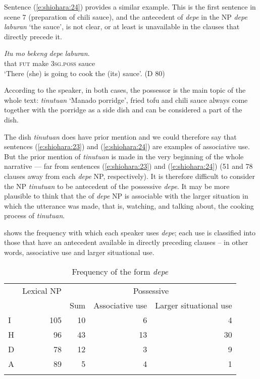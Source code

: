 \documentclass[output=paper
,modfonts
,nonflat]{langsci/langscibook}
\begin{document}
\noindent
Sentence (\ref{e:shiohara:24}) provides a similar example. This is the first sentence in scene 7 (preparation of chili sauce), and the antecedent of \textit{depe} in the NP \textit{depe laburan} ‘the sauce’, is not clear, or at least is unavailable in the clauses that directly precede it.

\begin{exe}
	\ex\label{e:shiohara:24}
	\gll \textit{Itu}   \textit{mo}   \textit{bekeng}   \textit{depe}  \textit{laburan}.\\
	that  \textsc{fut}  make    \textsc{3sg.poss}  sauce\\
	\glt ‘There (she) is going to cook the (its) sauce’. \hfill{(D 80)}
\end{exe}

\noindent
According to the speaker, in both cases, the possessor is the main topic of the whole text: \textit{tinutuan} ‘Manado porridge’, fried tofu and chili sauce always come together with the porridge as a side dish and can be considered a part of the dish.

The dish \textit{tinutuan} does have prior mention and we could therefore say that sentences (\ref{e:shiohara:23}) and (\ref{e:shiohara:24}) are examples of  associative use. But the prior mention of \textit{tinutuan} is made in the very beginning of the whole narrative — far from sentences (\ref{e:shiohara:23}) and (\ref{e:shiohara:24}) (51 and 78 clauses away from each \textit{depe} NP, respectively). It is therefore difficult to consider the NP \textit{tinutuan} to be antecedent of the possessive \textit{depe}. It may be more plausible to think that the  of \textit{depe} NP is associable with the larger situation in which the utterance was made, that is, watching, and talking about, the cooking process of \textit{tinutuan}.

 shows the frequency with which each speaker uses \textit{depe}; each use is classified into those that have an antecedent available in directly preceding clauses – in other words, associative  use and larger situational use.

\begin{table}
	\begin{tabularx}{\textwidth}{Xrrrr} 
		\lsptoprule
		& Lexical NP & \multicolumn{3}{c}{Possessive}\\\cmidrule{3-5}
		&  & Sum & Associative \isi{anaphoric} use & Larger situational use\\
		\midrule
		I & 105 & 10 & 6 & 4\\
		H & 96 & 43 & 13 & 30\\
		D & 78 & 12 & 3 & 9\\
		A & 89 & 5 & 4 & 1\\
		\lspbottomrule
	\end{tabularx}
	\caption{Frequency of the form \textit{depe}}
	\label{tab:8}
\end{table}
\end{document}
